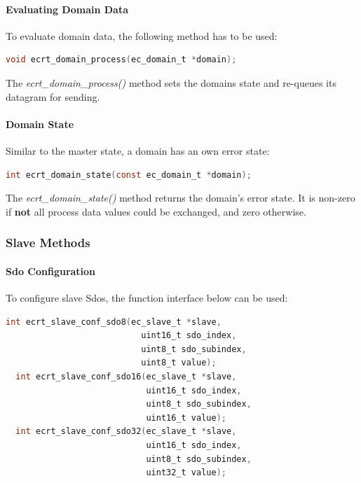 \documentclass[a4paper,12pt,BCOR6mm,bibtotoc,idxtotoc]{scrbook}
\begin{document}
\paragraph{Evaluating Domain Data}

To evaluate domain data, the following method has to be used:

\begin{lstlisting}[gobble=2,language=C]
  void ecrt_domain_process(ec_domain_t *domain);
\end{lstlisting}

The \textit{ecrt\_domain\_process()} method sets the domains state and
re-queues its datagram for sending.

\paragraph{Domain State}

Similar to the master state, a domain has an own error state:

\begin{lstlisting}[gobble=2,language=C]
  int ecrt_domain_state(const ec_domain_t *domain);
\end{lstlisting}

The \textit{ecrt\_domain\_state()} method returns the domain's error state. It
is non-zero if \textbf{not} all process data values could be exchanged, and
zero otherwise.

\subsubsection{Slave Methods}
\label{sec:ecrt-slave}

\paragraph{Sdo Configuration}

To configure slave Sdos, the function interface below can be used:

\begin{lstlisting}[gobble=2,language=C]
  int ecrt_slave_conf_sdo8(ec_slave_t *slave,
                           uint16_t sdo_index,
                           uint8_t sdo_subindex,
                           uint8_t value);
  int ecrt_slave_conf_sdo16(ec_slave_t *slave,
                            uint16_t sdo_index,
                            uint8_t sdo_subindex,
                            uint16_t value);
  int ecrt_slave_conf_sdo32(ec_slave_t *slave,
                            uint16_t sdo_index,
                            uint8_t sdo_subindex,
                            uint32_t value);
\end{lstlisting}
\end{document}
